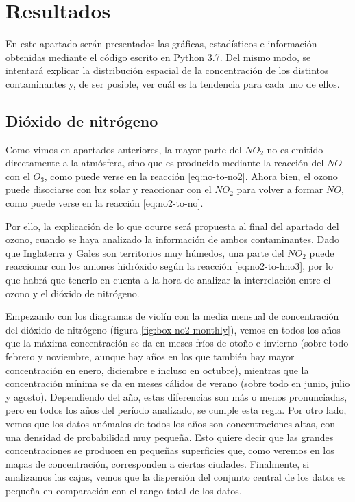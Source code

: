 \documentclass[12pt]{article}
\begin{document}
\newpage

\section{Resultados}

En este apartado serán presentados las gráficas, estadísticos e información obtenidas mediante el código escrito en Python 3.7. Del mismo modo, se intentará explicar la distribución espacial de la concentración de los distintos contaminantes y, de ser posible, ver cuál es la tendencia para cada uno de ellos.

\subsection{Dióxido de nitrógeno}

Como vimos en apartados anteriores, la mayor parte del $NO_{2}$ no es emitido directamente a la atmósfera, sino que es producido mediante la reacción del $NO$ con el $O_{3}$, como puede verse en la reacción \ref{eq:no-to-no2}. Ahora bien, el ozono puede disociarse con luz solar y reaccionar con el $NO_{2}$ para volver a formar $NO$, como puede verse en la reacción \ref{eq:no2-to-no}.

Por ello, la explicación de lo que ocurre será propuesta al final del apartado del ozono, cuando se haya analizado la información de ambos contaminantes. Dado que Inglaterra y Gales son territorios muy húmedos, una parte del $NO_{2}$ puede reaccionar con los aniones hidróxido según la reacción \ref{eq:no2-to-hno3}, por lo que habrá que tenerlo en cuenta a la hora de analizar la interrelación entre el ozono y el dióxido de nitrógeno.

Empezando con los diagramas de violín con la media mensual de concentración del dióxido de nitrógeno (figura \ref{fig:box-no2-monthly}), vemos en todos los años que la máxima concentración se da en meses fríos de otoño e invierno (sobre todo febrero y noviembre, aunque hay años en los que también hay mayor concentración en enero, diciembre e incluso en octubre), mientras que la concentración mínima se da en meses cálidos de verano (sobre todo en junio, julio y agosto). Dependiendo del año, estas diferencias son más o menos pronunciadas, pero en todos los años del período analizado, se cumple esta regla. Por otro lado, vemos que los datos anómalos de todos los años son concentraciones altas, con una densidad de probabilidad muy pequeña. Esto quiere decir que las grandes concentraciones se producen en pequeñas superficies que, como veremos en los mapas de concentración, corresponden a ciertas ciudades. Finalmente, si analizamos las cajas, vemos que la dispersión del conjunto central de los datos es pequeña en comparación con el rango total de los datos.
\end{document}
